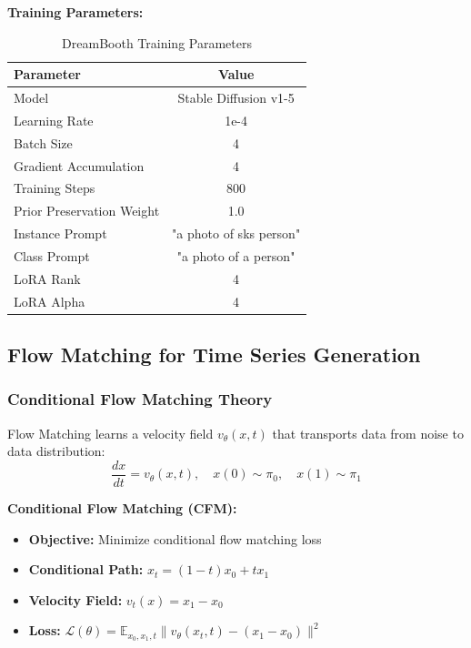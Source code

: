 \documentclass[a4paper,12pt]{article}
\begin{document}
\textbf{Training Parameters:}
\begin{table}[H]
    \centering
    \begin{tabular}{lc}
        \toprule
        \textbf{Parameter} & \textbf{Value} \\
        \midrule
        Model & Stable Diffusion v1-5 \\
        Learning Rate & 1e-4 \\
        Batch Size & 4 \\
        Gradient Accumulation & 4 \\
        Training Steps & 800 \\
        Prior Preservation Weight & 1.0 \\
        Instance Prompt & "a photo of sks person" \\
        Class Prompt & "a photo of a person" \\
        LoRA Rank & 4 \\
        LoRA Alpha & 4 \\
        \bottomrule
    \end{tabular}
    \caption{DreamBooth Training Parameters}
\end{table}

\subsection{Flow Matching for Time Series Generation}

\subsubsection{Conditional Flow Matching Theory}
Flow Matching learns a velocity field \(v_\theta(x, t)\) that transports data from noise to data distribution:
\[
\frac{dx}{dt} = v_\theta(x, t), \quad x(0) \sim \pi_0, \quad x(1) \sim \pi_1
\]

\textbf{Conditional Flow Matching (CFM):}
\begin{itemize}
    \item \textbf{Objective:} Minimize conditional flow matching loss
    \item \textbf{Conditional Path:} \(x_t = (1-t)x_0 + t x_1\)
    \item \textbf{Velocity Field:} \(v_t(x) = x_1 - x_0\)
    \item \textbf{Loss:} \(\mathcal{L}(\theta) = \mathbb{E}_{x_0, x_1, t} \|v_\theta(x_t, t) - (x_1 - x_0)\|^2\)
\end{itemize}
\end{document}
